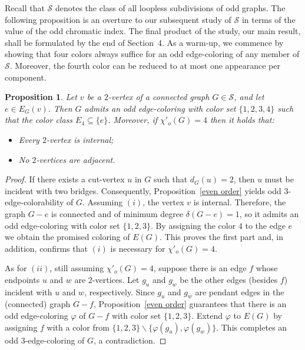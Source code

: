 \documentclass[a4paper,12pt]{article}
\newtheorem{proposition}[theorem]{Proposition}
\numberwithin{equation}{section}
\begin{document}
Recall that $\mathcal{S}$ denotes the class of all loopless subdivisions of odd graphs. The following proposition is an overture to our subsequent study of $\mathcal{S}$ in terms of the value of the odd chromatic index. The final product of the study, our main result, shall be formulated by the end of Section~4. As a warm-up, we commence by showing that four colors always suffice for an odd edge-coloring of any member of $\mathcal{S}$. Moreover, the fourth color can be reduced to at most one appearance per component.
\begin{proposition}
    \label{4-edge-colorability}
Let $v$ be a $2$-vertex of a connected graph $G\in \mathcal{S}$, and let $e\in E_G(v)$. Then $G$ admits an odd edge-coloring with color set $\{1,2,3,4\}$ such that the color class $E_4\subseteq \{e\}$. Moreover, if $\chi'_o(G)=4$ then it holds that:
 \begin{itemize}
 \item [$(i)$] Every $2$-vertex is internal;
 \item [$(ii)$] No $2$-vertices are adjacent.
 \end{itemize}
\end{proposition}
\begin{proof}
If there exists a cut-vertex $u$ in $G$ such that $d_G(u)=2$, then $u$ must be incident with two bridges. Consequently, Proposition~\ref{even order} yields odd $3$-edge-colorability of $G$. Assuming $(i)$, the vertex $v$ is internal. Therefore, the graph $G-e$ is connected and of minimum degree $\delta(G-e)=1$, so it admits an odd edge-coloring with color set $\{1,2,3\}$. By assigning the color $4$ to the edge $e$ we obtain the promised coloring of $E(G)$. This proves the first part and, in addition, confirms that $(i)$ is necessary for $\chi'_o(G)=4$.

As for $(ii)$, still assuming $\chi'_o(G)=4$, suppose there is an edge $f$ whose endpoints $u$ and $w$ are $2$-vertices. Let $g_u$ and $g_w$ be the other edges (besides $f$) incident with $u$ and $w$, respectively. Since $g_u$ and $g_w$ are pendant edges in the (connected) graph $G-f$, Proposition~\ref{even order} guarantees that there is an odd edge-coloring $\varphi$ of $G-f$ with color set $\{1,2,3\}$. Extend $\varphi$ to $E(G)$ by assigning $f$ with a color from $\{1,2,3\}\backslash\{\varphi(g_u),\varphi(g_w)\}$. This completes an odd $3$-edge-coloring of $G$, a contradiction.\end{proof}
\end{document}
